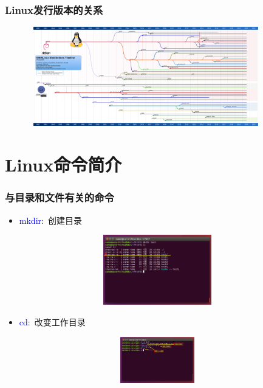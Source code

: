\frame
{
	\frametitle{\textrm{Linux}发行版本的关系}
\begin{figure}[h!]
\centering
\vspace{21.5pt}
\includegraphics[height=1.7in,width=4.0in,viewport=0 0 2400 1080,clip]{Figures/Linux_distro-timeline.png}
\label{Linux-distri-timeline}
\end{figure}
}
\section{\rm{Linux}命令简介}
\frame
{
	\frametitle{与目录和文件有关的命令}
	\begin{itemize}
\setlength{\itemsep}{-10pt}
		\item \textcolor{blue}{mkdir}:~创建目录
\begin{figure}[h!]
\centering
\vspace{-11.5pt}
\includegraphics[height=1.2in,width=3.9in,viewport=0 220 800 470,clip]{Figures/Ubuntu-mkdir.png}
\label{Linux-command-mkdir}
\end{figure}
		\item \textcolor{blue}{cd}:~改变工作目录
\begin{figure}[h!]
\centering
\vspace{-9.5pt}
\includegraphics[height=0.8in,width=3.9in,viewport=0 310 800 470,clip]{Figures/Ubuntu-cd.png}
\label{Linux-command-cd}
\end{figure}
	\end{itemize}
}

